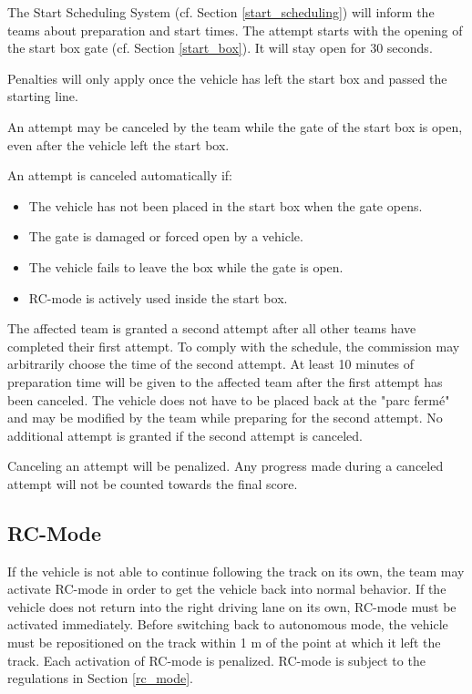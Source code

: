 The Start Scheduling System (cf. Section \ref{start_scheduling}) will inform
the teams about preparation and start times. The attempt starts with the
opening of the start box gate (cf. Section \ref{start_box}). It will stay open
for 30 seconds.

Penalties will only apply once the vehicle has left the start box and passed
the starting line.

An attempt may be canceled by the team while the gate of the start box is open,
even after the vehicle left the start box.

An attempt is canceled automatically if:
\begin{itemize}
    \item The vehicle has not been placed in the start box when the gate opens.
    \item The gate is damaged or forced open by a vehicle.
    \item The vehicle fails to leave the box while the gate is open.
    \item RC-mode is actively used inside the start box.
\end{itemize}

The affected team is granted a second attempt after all other teams have completed their first attempt.
To comply with the schedule, the commission may arbitrarily choose the time of the second attempt.
At least 10 minutes of preparation time will be given to the affected team after the first attempt has been canceled.
The vehicle does not have to be placed back at the "parc fermé" and may be modified by the team while preparing for the second attempt.
No additional attempt is granted if the second attempt is canceled.

Canceling an attempt will be penalized.
Any progress made during a canceled attempt will not be counted towards the final score.

\subsection{RC-Mode}

If the vehicle is not able to continue following the track on its own, the team may activate RC-mode in order to get the vehicle back into normal behavior.
If the vehicle does not return into the right driving lane on its own, RC-mode must be activated immediately.
Before switching back to autonomous mode, the vehicle must be repositioned on the track within 1 m of the point at which it left the track.
Each activation of RC-mode is penalized.
RC-mode is subject to the regulations in Section \ref{rc_mode}.

